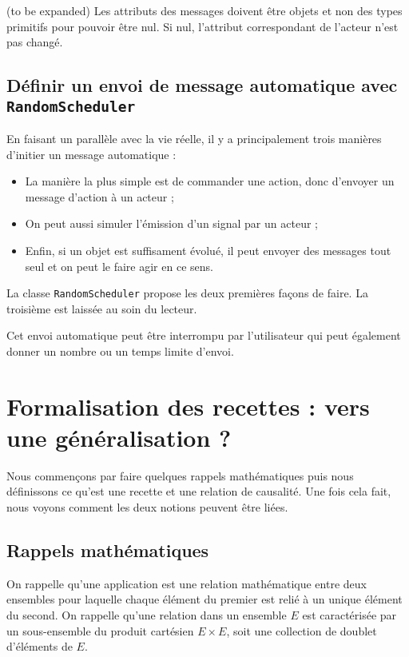 \documentclass[11pt]{article}
\begin{document}
(to be expanded) Les attributs des messages doivent être objets et non des types primitifs pour pouvoir être nul. Si nul, l'attribut correspondant de l'acteur n'est pas changé.

\subsection{Définir un envoi de message automatique avec \texttt{RandomScheduler}}

En faisant un parallèle avec la vie réelle, il y a principalement trois manières d'initier un message automatique :
\begin{itemize}
\item La manière la plus simple est de commander une action, donc d'envoyer un message d'action à un acteur ;
\item On peut aussi simuler l'émission d'un signal par un acteur ;
\item Enfin, si un objet est suffisament évolué, il peut envoyer des messages tout seul et on peut le faire agir en ce sens.
\end{itemize}

La classe \texttt{RandomScheduler} propose les deux premières façons de faire. La troisième est laissée au soin du lecteur.

Cet envoi automatique peut être interrompu par l'utilisateur qui peut également donner un nombre ou un temps limite d'envoi.

\section{Formalisation des recettes : vers une généralisation ?}

Nous commençons par faire quelques rappels mathématiques puis nous définissons ce qu'est une recette et une relation de causalité. Une fois cela fait, nous voyons comment les deux notions peuvent être liées.

\subsection{Rappels mathématiques}

On rappelle qu'une application est une relation mathématique entre deux ensembles pour laquelle chaque élément du premier est relié à un unique élément du second. On rappelle qu'une relation dans un ensemble $E$ est caractérisée par un sous-ensemble du produit cartésien $E × E$, soit une collection de doublet d'éléments de $E$.
\end{document}
